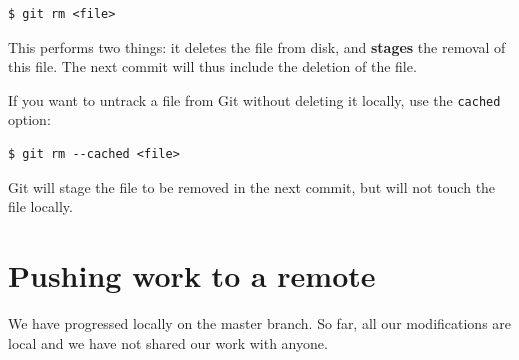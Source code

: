 \documentclass{tufte-handout}
\begin{document}
\begin{lstlisting}[style=BashInputStyle]
  $ git rm <file>
\end{lstlisting}

This performs two things: it deletes the file from disk, and \textbf{stages} the removal of this file.
The next commit will thus include the deletion of the file.

If you want to untrack a file from Git without deleting it locally, use the \texttt{cached} option:

\begin{lstlisting}[style=BashInputStyle]
  $ git rm --cached <file>
\end{lstlisting}

Git will stage the file to be removed in the next commit, but will not touch the file locally.

\pagebreak

\section{Pushing work to a remote}

We have progressed locally on the master branch.
So far, all our modifications are local and we have not shared our work with anyone.
\end{document}
